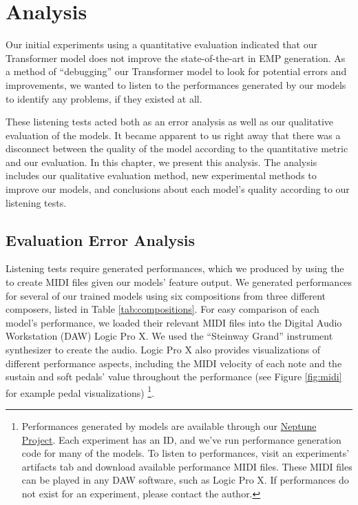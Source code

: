 \chapter{Analysis} \label{ch:ch6}
Our initial experiments using a quantitative evaluation indicated that our Transformer model does not improve the state-of-the-art in EMP generation. As a method of ``debugging'' our Transformer model to look for potential errors and improvements, we wanted to listen to the performances generated by our models to identify any problems, if they existed at all. 

These listening tests acted both as an error analysis as well as our qualitative evaluation of the models. It became apparent to us right away that there was a disconnect between the quality of the model according to the quantitative metric and our evaluation. In this chapter, we present this analysis. The analysis includes our qualitative evaluation method, new experimental methods to improve our models, and conclusions about each model's quality according to our listening tests. 



\section{Evaluation Error Analysis}\label{sec:qualitative-eval-problems}
Listening tests require generated performances, which we produced by using the \vnetf{} to create MIDI files given our models' feature output. We generated performances for several of our trained models using six compositions from three different composers, listed in Table \ref{tab:compositions}. For easy comparison of each model's performance, we loaded their relevant MIDI files into the Digital Audio Workstation (DAW) Logic Pro X. We used the ``Steinway Grand'' instrument synthesizer to create the audio. Logic Pro X also provides visualizations of different performance aspects, including the MIDI velocity of each note and the sustain and soft pedals' value throughout the performance (see Figure \ref{fig:midi} for example pedal visualizations)%
\footnote{Performances generated by models are available through our \href{https://ui.neptune.ai/richt3211/thesis/experiments}{Neptune Project}. Each experiment has an ID, and we've run performance generation code for many of the models. To listen to performances, visit an experiments' artifacts tab and download available performance MIDI files. These MIDI files can be played in any DAW software, such as Logic Pro X. If performances do not exist for an experiment, please contact the author.}. 

